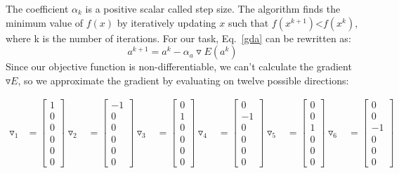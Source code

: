 The coefficient $\alpha_{k}$ is a positive scalar called step size. The algorithm finds the minimum value of $f(x)$ by iteratively updating $x$ such that $f(x^{k+1})$<$f(x^{k})$, where k is the number of iterations. For our task, Eq.~\ref{gda} can be rewritten as:
\begin{equation}
\label{gdaE}
a^{k+1}=a^{k}-\alpha_{a}\triangledown E(a^{k})
\end{equation}
Since our objective function is non-differentiable, we can't calculate the gradient $\triangledown E$, so we approximate the gradient by evaluating on twelve possible directions:

\begin{equation}
\begin{aligned}
\triangledown_{1}&=\begin{bmatrix}1\\0\\0\\0\\0\\0\end{bmatrix}
\triangledown_{2}&=\begin{bmatrix}-1\\0\\0\\0\\0\\0\end{bmatrix}
\triangledown_{3}&=\begin{bmatrix}0\\1\\0\\0\\0\\0\end{bmatrix}
\triangledown_{4}&=\begin{bmatrix}0\\-1\\0\\0\\0\\0\end{bmatrix}
\triangledown_{5}&=\begin{bmatrix}0\\0\\1\\0\\0\\0\end{bmatrix}
\triangledown_{6}&=\begin{bmatrix}0\\0\\-1\\0\\0\\0\end{bmatrix} \\

\end{aligned}
\end{equation}
